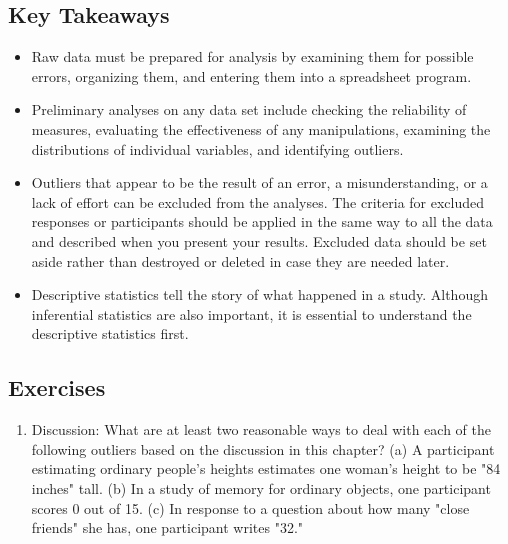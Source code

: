 \subsection{Key Takeaways}
\begin{fullwidth}
\begin{itemize}
\item Raw data must be prepared for analysis by examining them for possible errors, organizing them, and entering them into a spreadsheet program.
\item Preliminary analyses on any data set include checking the reliability of measures, evaluating the effectiveness of any manipulations, examining the distributions of individual variables, and identifying outliers.
\item Outliers that appear to be the result of an error, a misunderstanding, or a lack of effort can be excluded from the analyses. The criteria for excluded responses or participants should be applied in the same way to all the data and described when you present your results. Excluded data should be set aside rather than destroyed or deleted in case they are needed later.
\item Descriptive statistics tell the story of what happened in a study. Although inferential statistics are also important, it is essential to understand the descriptive statistics first.
\end{itemize}
\end{fullwidth}



\subsection{Exercises}
\begin{fullwidth}
\begin{enumerate}
\item Discussion: What are at least two reasonable ways to deal with each of the following outliers based on the discussion in this chapter? (a) A participant estimating ordinary people's heights estimates one woman's height to be "84 inches" tall. (b) In a study of memory for ordinary objects, one participant scores 0 out of 15. (c) In response to a question about how many "close friends" she has, one participant writes "32."
\end{enumerate}
\end{fullwidth}
